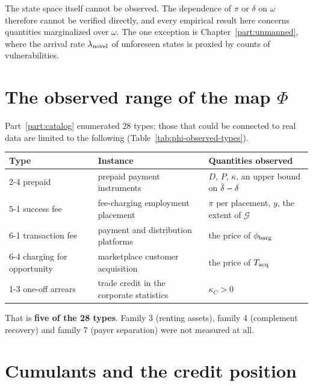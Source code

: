 \begin{remark}
The state space itself cannot be observed. The dependence of $\pi$ or $\delta$ on $\omega$
therefore cannot be verified directly, and every empirical result here concerns quantities
marginalized over $\omega$. The one exception is Chapter~\ref{part:unmanned}, where the
arrival rate $\lambda_{\rm novel}$ of unforeseen states is proxied by counts of
vulnerabilities.
\end{remark}

\section{The observed range of the map \texorpdfstring{$\Phi$}{Phi}}

Part~\ref{part:catalog} enumerated 28 types; those that could be connected to real data are
limited to the following (Table~\ref{tab:phi-observed-types}).

\begin{center}
\begin{tabularx}{\textwidth}{@{}llX@{}}
\toprule
Type & Instance & Quantities observed \\
\midrule
2-4 prepaid & prepaid payment instruments & $D$, $P$, $\kappa$, an upper bound on $\dbar-\delta$ \\
5-1 success fee & fee-charging employment placement & $\pi$ per placement, $y$, the extent of $\mathcal{G}$ \\
6-1 transaction fee & payment and distribution platforms & the price of $\phi_{\rm barg}$ \\
6-4 charging for opportunity & marketplace customer acquisition & the price of $T_{\rm acq}$ \\
1-3 one-off arrears & trade credit in the corporate statistics & $\kappa_C>0$ \\
\bottomrule
\end{tabularx}
\label{tab:phi-observed-types}
\end{center}

That is \textbf{five of the 28 types}. Family 3 (renting assets), family 4 (complement
recovery) and family 7 (payer separation) were not measured at all.

\section{Cumulants and the credit position}

